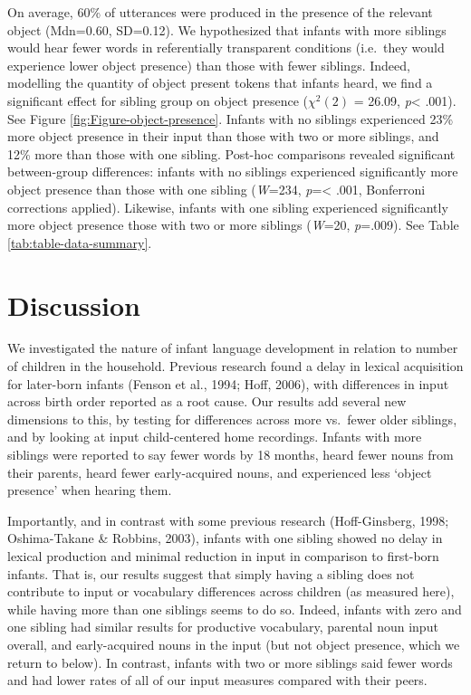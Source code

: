 \documentclass[
  english,
  man,floatsintext]{apa6}
\begin{document}
On average, 60\% of utterances were produced in the presence of the relevant object (Mdn=0.60, SD=0.12). We hypothesized that infants with more siblings would hear fewer words in referentially transparent conditions (i.e.~they would experience lower object presence) than those with fewer siblings. Indeed, modelling the quantity of object present tokens that infants heard, we find a significant effect for sibling group on object presence (\(\chi^2 (2)\) = 26.09, \emph{p}\textless{} .001). See Figure \ref{fig:Figure-object-presence}. Infants with no siblings experienced 23\% more object presence in their input than those with two or more siblings, and 12\% more than those with one sibling. Post-hoc comparisons revealed significant between-group differences: infants with no siblings experienced significantly more object presence than those with one sibling (\emph{W}=234, \emph{p}=\textless{} .001, Bonferroni corrections applied). Likewise, infants with one sibling experienced significantly more object presence those with two or more siblings (\emph{W}=20, \emph{p}=.009). See Table \ref{tab:table-data-summary}.

\hypertarget{discussion}{%
\section{Discussion}\label{discussion}}

We investigated the nature of infant language development in relation to number of children in the household. Previous research found a delay in lexical acquisition for later-born infants (Fenson et al., 1994; Hoff, 2006), with differences in input across birth order reported as a root cause. Our results add several new dimensions to this, by testing for differences across more vs.~fewer older siblings, and by looking at input child-centered home recordings. Infants with more siblings were reported to say fewer words by 18 months, heard fewer nouns from their parents, heard fewer early-acquired nouns, and experienced less `object presence' when hearing them.

Importantly, and in contrast with some previous research (Hoff-Ginsberg, 1998; Oshima-Takane \& Robbins, 2003), infants with one sibling showed no delay in lexical production and minimal reduction in input in comparison to first-born infants. That is, our results suggest that simply having a sibling does not contribute to input or vocabulary differences across children (as measured here), while having more than one siblings seems to do so. Indeed, infants with zero and one sibling had similar results for productive vocabulary, parental noun input overall, and early-acquired nouns in the input (but not object presence, which we return to below). In contrast, infants with two or more siblings said fewer words and had lower rates of all of our input measures compared with their peers.
\end{document}
